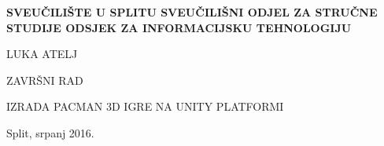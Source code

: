 
\begin{titlepage}
\bfseries
\headerdata
{SVEUČILIŠTE U SPLITU}
{SVEUČILIŠNI ODJEL ZA STRUČNE STUDIJE}
{ODSJEK ZA INFORMACIJSKU TEHNOLOGIJU}

\vspace*{6cm}
\begin{center}
{\Large LUKA ATELJ}

\vspace*{3cm}

{\large {ZAVRŠNI RAD}}

\vspace*{0.5cm}
\Huge IZRADA PACMAN 3D IGRE NA UNITY PLATFORMI\\[1cm]

\end{center}
\begin{center}
\vfill
{\large Split, srpanj 2016.}
\end{center}
\end{titlepage}